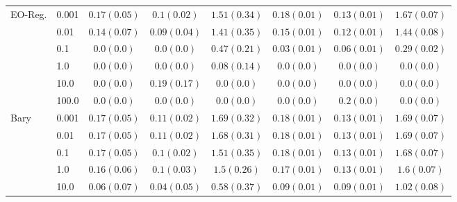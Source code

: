 \begin{table*}
\begin{tabular*}{\linewidth}{ll| *{3}{c}|*{3}{c}}
\midrule
EO-Reg. & 0.001 & $0.17\scriptscriptstyle(0.05)$ & $0.1\scriptscriptstyle(0.02)$ & $1.51\scriptscriptstyle(0.34)$ & $0.18\scriptscriptstyle(0.01)$ & $0.13\scriptscriptstyle(0.01)$ & $1.67\scriptscriptstyle(0.07)$ \\
	 & 0.01 & $0.14\scriptscriptstyle(0.07)$ & $0.09\scriptscriptstyle(0.04)$ & $1.41\scriptscriptstyle(0.35)$ & $0.15\scriptscriptstyle(0.01)$ & $0.12\scriptscriptstyle(0.01)$ & $1.44\scriptscriptstyle(0.08)$ \\
	 & 0.1 & $0.0\scriptscriptstyle(0.0)$ & $0.0\scriptscriptstyle(0.0)$ & $0.47\scriptscriptstyle(0.21)$ & $0.03\scriptscriptstyle(0.01)$ & $0.06\scriptscriptstyle(0.01)$ & $0.29\scriptscriptstyle(0.02)$ \\
	 & 1.0 & $0.0\scriptscriptstyle(0.0)$ & $0.0\scriptscriptstyle(0.0)$ & $0.08\scriptscriptstyle(0.14)$ & $0.0\scriptscriptstyle(0.0)$ & $0.0\scriptscriptstyle(0.0)$ & $0.0\scriptscriptstyle(0.0)$ \\
	 & 10.0 & $0.0\scriptscriptstyle(0.0)$ & $0.19\scriptscriptstyle(0.17)$ & $0.0\scriptscriptstyle(0.0)$ & $0.0\scriptscriptstyle(0.0)$ & $0.0\scriptscriptstyle(0.0)$ & $0.0\scriptscriptstyle(0.0)$ \\
	 & 100.0 & $0.0\scriptscriptstyle(0.0)$ & $0.0\scriptscriptstyle(0.0)$ & $0.0\scriptscriptstyle(0.0)$ & $0.0\scriptscriptstyle(0.0)$ & $0.2\scriptscriptstyle(0.0)$ & $0.0\scriptscriptstyle(0.0)$ \\
\midrule
Bary & 0.001 & $0.17\scriptscriptstyle(0.05)$ & $0.11\scriptscriptstyle(0.02)$ & $1.69\scriptscriptstyle(0.32)$ & $0.18\scriptscriptstyle(0.01)$ & $0.13\scriptscriptstyle(0.01)$ & $1.69\scriptscriptstyle(0.07)$ \\
	 & 0.01 & $0.17\scriptscriptstyle(0.05)$ & $0.11\scriptscriptstyle(0.02)$ & $1.68\scriptscriptstyle(0.31)$ & $0.18\scriptscriptstyle(0.01)$ & $0.13\scriptscriptstyle(0.01)$ & $1.69\scriptscriptstyle(0.07)$ \\
	 & 0.1 & $0.17\scriptscriptstyle(0.05)$ & $0.1\scriptscriptstyle(0.02)$ & $1.51\scriptscriptstyle(0.35)$ & $0.18\scriptscriptstyle(0.01)$ & $0.13\scriptscriptstyle(0.01)$ & $1.68\scriptscriptstyle(0.07)$ \\
	 & 1.0 & $0.16\scriptscriptstyle(0.06)$ & $0.1\scriptscriptstyle(0.03)$ & $1.5\scriptscriptstyle(0.26)$ & $0.17\scriptscriptstyle(0.01)$ & $0.13\scriptscriptstyle(0.01)$ & $1.6\scriptscriptstyle(0.07)$ \\
	 & 10.0 & $0.06\scriptscriptstyle(0.07)$ & $0.04\scriptscriptstyle(0.05)$ & $0.58\scriptscriptstyle(0.37)$ & $0.09\scriptscriptstyle(0.01)$ & $0.09\scriptscriptstyle(0.01)$ & $1.02\scriptscriptstyle(0.08)$ \\

\end{tabular*}
\end{table*}
